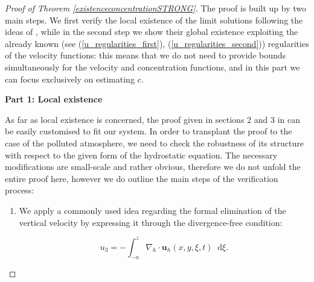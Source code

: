 \documentclass[11pt]{article}
\newcommand*\diff{\mathop{}\!\mathrm{d}}
\begin{document}
\begin{proof}[Proof of Theorem \ref{existenceconcentrationSTRONG}]

The proof is built up by two main steps. We first verify the local existence of the limit solutions following the ideas of \cite{cao2014local}, while in the second step we show their global existence exploiting the already known (see (\ref{u_regularities_first}), (\ref{u_regularities_second})) regularities of the velocity functions: this means that we do not need to provide bounds simultaneously for the velocity and concentration functions, and in this part we can focus exclusively on estimating $c.$

\bigskip

\textbf{Part 1: Local existence}

As far as local existence is concerned, the proof given in sections 2 and 3 in \cite{cao2014local} can be easily customised to fit our system. In order to transplant the proof to the case of the polluted atmosphere, we need to check the robustness of its structure with respect to the given form of the hydrostatic equation. The necessary modifications are small-scale and rather obvious, therefore we do not unfold the entire proof here, however we do outline the main steps of the verification process:

\begin{enumerate}

\item We apply a commonly used idea regarding the formal elimination of the vertical velocity by expressing it through the divergence-free condition:

\begin{equation} \label{u_3_expressed_div_free}
u_3 = - \int_{-a}^z \nabla_h \cdot \mathbf{u}_h (x, y, \xi, t) \diff \xi.
\end{equation}


\end{enumerate}
\end{proof}
\end{document}

